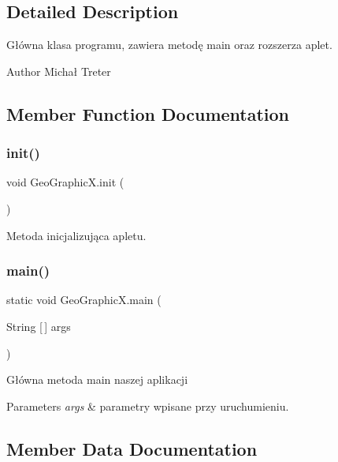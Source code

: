 \subsection{Detailed Description}
Główna klasa programu, zawiera metodę main oraz rozszerza aplet. \begin{DoxyAuthor}{Author}
Michał Treter 
\end{DoxyAuthor}


\subsection{Member Function Documentation}
\mbox{\label{class_geo_graphic_x_a8266e087ac487e55560443a44f5c87af}} 
\subsubsection{init()}
{\footnotesize\ttfamily void Geo\+Graphic\+X.\+init (\begin{DoxyParamCaption}{ }\end{DoxyParamCaption})}

Metoda inicjalizująca apletu. \mbox{\label{class_geo_graphic_x_a4cbdc0d31f6032904eae7ecb20b9fc3a}} 
\subsubsection{main()}
{\footnotesize\ttfamily static void Geo\+Graphic\+X.\+main (\begin{DoxyParamCaption}\item[{String [$\,$]}]{args }\end{DoxyParamCaption})\hspace{0.3cm}{\ttfamily [static]}}

Główna metoda main naszej aplikacji 
\begin{DoxyParams}{Parameters}
{\em args} & parametry wpisane przy uruchumieniu. \\
\hline
\end{DoxyParams}


\subsection{Member Data Documentation}
\mbox{\label{class_geo_graphic_x_a08b05acbc89547ffa879e3e1c14b03e8}} 
